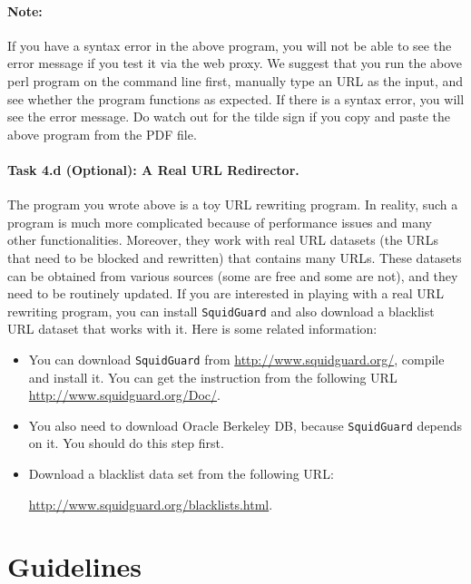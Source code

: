 \paragraph{Note:} If you have a syntax error in the above program, you will not be able to see 
the error message if you test it via the web proxy. We suggest that you 
run the above perl program on the command line first, manually
type an URL as the input, and see whether the program functions
as expected. If there is a syntax error, you will see the error message.
Do watch out for the tilde sign if you copy and paste the above
program from the PDF file.



\paragraph{Task 4.d (Optional): A Real URL Redirector.} 
The program you wrote above is a toy URL rewriting program. In reality,
such a program is much more complicated because of performance issues
and many other functionalities. Moreover, they work with 
real URL datasets (the URLs that need to be blocked and rewritten) that
contains many URLs. These datasets can be obtained 
from various sources (some are free and some are not), and they
need to be routinely updated. If you are interested in playing with 
a real URL rewriting program, you can install {\tt SquidGuard} and 
also download a blacklist URL dataset that works with it. Here is some 
related information:
\begin{itemize}
\item You can download {\tt SquidGuard} from
\url{http://www.squidguard.org/}, compile and install it.
You can get the instruction from the following URL
\url{http://www.squidguard.org/Doc/}.

\item You also need to download Oracle Berkeley DB, because 
{\tt SquidGuard} depends on it. You should do this step first.

\item Download a blacklist data set from the following URL:

\url{http://www.squidguard.org/blacklists.html}.

\end{itemize}









\section{Guidelines}
\label{sec:guidelines}

